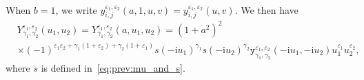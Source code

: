 \documentclass[11pt,twoside]{amsart}
\theoremstyle{plain}
\numberwithin{quest}{section}
\theoremstyle{remark}
\numberwithin{rem}{section}
\theoremstyle{definition}
\newcommand{\eps}{\varepsilon}
\begin{document}
\begin{appendix}
\begin{equation*}
\begin{split}
            \end{split}
		\end{equation*}
		When $b=1$, we write $y^{\eps_1,\eps_2}_{i,j}(a,1,u,v)=y^{\eps_1,\eps_2}_{i,j}(u,v)$.
		We then have
		\begin{equation}
			\label{asfo:eq:Y}
			\begin{split}
				&Y^{\eps_1,\eps_2}_{\gamma_1,\gamma_2}(u_1,u_2)= Y^{\eps_1,\eps_2}_{\gamma_1,\gamma_2}(a,u_1,u_2)=(1+a^2)^2  \\
				&\times (-1)^{\eps_1 \eps_2+\gamma_1(1 +\eps_2)+\gamma_2(1+\eps_1)}
				s(-\mathrm{i}u_1)^{\gamma_1} s(-\mathrm{i} u_2)^{\gamma_2} \mathtt{y}_{\gamma_1,\gamma_2}^{\eps_1,\eps_2} (-\mathrm{i}u_1 ,- \mathrm{i} u_2)u_1^{\eps_1} u_2^{\eps_2},
			\end{split}
		\end{equation}
		where $s$ is defined in~\eqref{eq:prev:mu_and_s}.
		
		
		
		
	\end{appendix}

	
	
	
\end{document}
